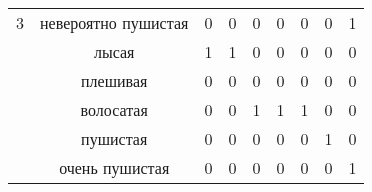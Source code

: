 \begin{table}[H]
\begin{tabular}{|c|c|ccccccc|}
		\multirow{-6}{*}{{\color[HTML]{333333} 3}}                                 & {\color[HTML]{333333} невероятно пушистая} & \multicolumn{1}{c|}{{\color[HTML]{333333} 0}} & \multicolumn{1}{c|}{{\color[HTML]{333333} 0}} & \multicolumn{1}{c|}{0}     & \multicolumn{1}{c|}{0}      & \multicolumn{1}{c|}{0}      & \multicolumn{1}{c|}{0}        & \multicolumn{1}{c|}{1}                       \\ \cline{1-9}
		{\color[HTML]{333333} }                                                    & лысая                                 & \multicolumn{1}{c|}{1}                        & \multicolumn{1}{c|}{1}                        & \multicolumn{1}{c|}{0}     & \multicolumn{1}{c|}{0}      & \multicolumn{1}{c|}{0}      & \multicolumn{1}{c|}{0}        & \multicolumn{1}{c|}{0}  \\ \cline{2-9}
		{\color[HTML]{333333} }                                                    & {\color[HTML]{333333} плешивая}    & \multicolumn{1}{c|}{{\color[HTML]{333333} 0}} & \multicolumn{1}{c|}{{\color[HTML]{333333} 0}} & \multicolumn{1}{c|}{0}     & \multicolumn{1}{c|}{0}      & \multicolumn{1}{c|}{0}      & \multicolumn{1}{c|}{0}        & \multicolumn{1}{c|}{0}                       \\ \cline{2-9}
		{\color[HTML]{333333} }                                                    & {\color[HTML]{333333} волосатая}    & \multicolumn{1}{c|}{{\color[HTML]{333333} 0}} & \multicolumn{1}{c|}{{\color[HTML]{333333} 0}} & \multicolumn{1}{c|}{1}     & \multicolumn{1}{c|}{1}      & \multicolumn{1}{c|}{1}      & \multicolumn{1}{c|}{0}        & \multicolumn{1}{c|}{0}                       \\ \cline{2-9}
		{\color[HTML]{333333} }                                                    & {\color[HTML]{333333} пушистая}             & \multicolumn{1}{c|}{{\color[HTML]{333333} 0}} & \multicolumn{1}{c|}{{\color[HTML]{333333} 0}} & \multicolumn{1}{c|}{0}     & \multicolumn{1}{c|}{0}      & \multicolumn{1}{c|}{0}      & \multicolumn{1}{c|}{1}        & \multicolumn{1}{c|}{0}                       \\ \cline{2-9}
		{\color[HTML]{333333} }                                                    & {\color[HTML]{333333} очень пушистая}       & \multicolumn{1}{c|}{{\color[HTML]{333333} 0}} & \multicolumn{1}{c|}{{\color[HTML]{333333} 0}} & \multicolumn{1}{c|}{0}     & \multicolumn{1}{c|}{0}      & \multicolumn{1}{c|}{0}      & \multicolumn{1}{c|}{0}        & \multicolumn{1}{c|}{1}                       \\ \cline{2-9}

\end{tabular}
\end{table}
